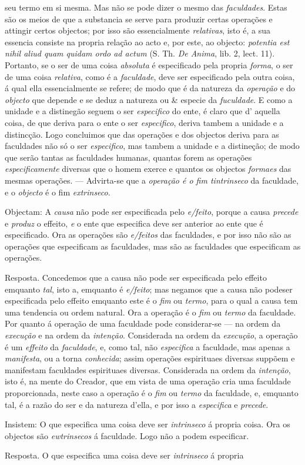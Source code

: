 seu termo em si mesma. Mas não se pode dizer o mesmo das \emph{faculdades}. Estas são os meios de que a substancia se serve para produzir certas operações e attingir certos objectos; por isso são essencialmente \emph{relativas}, isto é, a sua essencia consiste na propria relação ao acto e, por este, ao objecto: \emph{potentia est nihil aliud quam quidam ordo ad actum} (S. Th. \emph{De Anima}, lib. 2, lect. 11). Portanto, se o ser de uma coisa \emph{absoluta} é especificado pela propria \emph{forma}, o ser de uma coisa \emph{relativa}, como é a \emph{faculdade}, deve ser especificado pela outra coisa, á qual ella essencialmente se refere; de modo que é da natureza da \emph{operação} e do \emph{objecto} que depende e se deduz a natureza ou \& especie da \emph{fuculdade}. E como a unidade e a distinegão seguem o ser \emph{especifico} do ente, é claro que d' aquella coisa, de que deriva para o ente o ser \emph{especifico}, deriva tambem a unidade e a distincção. Logo concluimos que das operações e dos objectos deriva para as faculdades não só o ser \emph{especifico}, mas tambem a unidade e a distineção; de modo que serão tantas as faculdades humanas, quantas forem as operações \emph{especificamente} diversas que o homem exerce e quantos os objectos \emph{formaes} das mesmas operações. --- Advirta-se que a \emph{operação é o fim tintrinseco} da faculdade, e o \emph{objecto} é o fim \emph{extrinseco}.\par Objectam: A \emph{causa} não pode ser especificada pelo \emph{e/feito}, porque a causa \emph{precede} e \emph{produz} o effeito, \emph{e} o ente que especifica deve ser anterior ao ente que é especificado. Ora as operações são \emph{e/feitos} das faculdades, e por isso não são as operações que especificam as faculdades, mas são as faculdades que especificam as operações.\par Resposta. Concedemos que a causa não pode ser especificada pelo effeito emquanto \emph{tal}, isto a, emquanto é \emph{e/feito}; mas negamos que a causa não podeser especificada pelo effeito emquanto este é o \emph{fim} ou \emph{termo}, para o qual a causa tem uma tendencia ou ordem natural. Ora a operação é o \emph{fim} ou \emph{termo} da faculdade. Por quanto á operação de uma faculdade pode considerar-se --- na ordem da \emph{execução} e na ordem da \emph{intenção}. Considerada na ordem da \emph{execução}, a operação é um \emph{effeito} da \emph{faculdade}, e, como tal, não \emph{especifica} a faculdade, mas apenas a \emph{manifesta}, ou a torna \emph{conhecida}; assim operações espirituaes diversas suppõem e manifestam faculdades espirituaes diversas. Considerada na ordem da \emph{intenção}, isto é, na mente do Creador, que em vista de uma operação cria uma faculdade proporcionada, neste caso a operação é o \emph{fim} ou \emph{termo} da faculdade, e, emquanto tal, é a razão do ser e da natureza d'ella, e por isso a \emph{especifica} e \emph{precede}.\par Insistem: O que especifica uma coisa deve ser \emph{intrinseco} á propria coisa. Ora os objectos são \emph{ewtrinsecos} á faculdade. Logo não a podem especificar.\par Resposta. O que especifica uma coisa deve ser \emph{intrinseco} á propria 